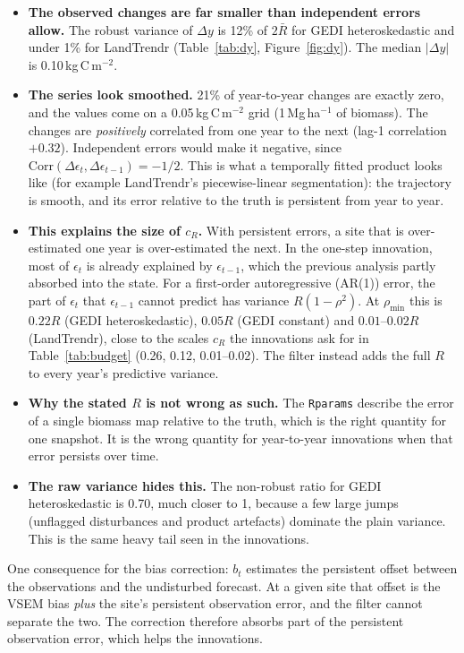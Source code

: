 \documentclass[11pt]{article}
\newcommand{\code}[1]{\texttt{#1}}
\begin{document}
\begin{itemize}
  \item \textbf{The observed changes are far smaller than independent errors allow.} The robust variance of $\Delta y$
  is 12\% of $2\bar R$ for GEDI heteroskedastic and under 1\% for LandTrendr
  (Table~\ref{tab:dy}, Figure~\ref{fig:dy}). The median $|\Delta y|$ is 0.10\,kg\,C\,m$^{-2}$.
  \item \textbf{The series look smoothed.} 21\% of year-to-year changes are exactly zero, and the values come on a 0.05\,kg\,C\,m$^{-2}$ grid
  (1\,Mg\,ha$^{-1}$ of biomass). The changes are \emph{positively} correlated from one year to
  the next (lag-1 correlation $+0.32$). Independent errors would make it negative, since
  $\mathrm{Corr}(\Delta\epsilon_t, \Delta\epsilon_{t-1}) = -1/2$. This is what a
  temporally fitted product looks like (for example LandTrendr's piecewise-linear
  segmentation): the trajectory is smooth, and its error relative to the truth is persistent from year to
  year.
  \item \textbf{This explains the size of $c_R$.} With persistent errors, a site that is over-estimated one year is
  over-estimated the next. In the one-step innovation, most of $\epsilon_t$ is already
  explained by $\epsilon_{t-1}$, which the previous analysis partly absorbed into the state.
  For a first-order autoregressive (AR(1)) error, the part of $\epsilon_t$ that $\epsilon_{t-1}$ cannot predict
  has variance $R(1-\rho^2)$. At $\rho_{\min}$ this is $0.22R$ (GEDI heteroskedastic),
  $0.05R$ (GEDI constant) and $0.01$--$0.02R$ (LandTrendr), close to the scales $c_R$ the
  innovations ask for in Table~\ref{tab:budget} (0.26, 0.12, 0.01--0.02). The filter
  instead adds the full $R$ to every year's predictive variance.
  \item \textbf{Why the stated $R$ is not wrong as such.} The \code{Rparams} describe the error of a single biomass map
  relative to the truth, which is the right quantity for one snapshot. It is the wrong
  quantity for year-to-year innovations when that error persists over time.
  \item \textbf{The raw variance hides this.} The non-robust ratio for GEDI heteroskedastic is 0.70, much
  closer to 1, because a few large jumps (unflagged disturbances and product artefacts)
  dominate the plain variance. This is the same heavy tail seen in the innovations.
\end{itemize}

One consequence for the bias correction: $b_t$ estimates the persistent offset between the
observations and the undisturbed forecast. At a given site that offset is the VSEM bias
\emph{plus} the site's persistent observation error, and the filter cannot separate the two. The
correction therefore absorbs part of the persistent observation error, which helps the innovations.
\end{document}
